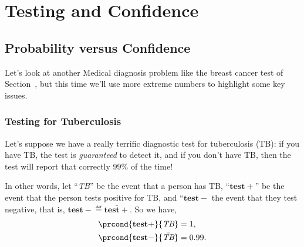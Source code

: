 \chapter{Testing and Confidence}\label{sec: Confidence_v_Prob}

\section{Probability versus Confidence}\label{sec: Confidence_v_Prob}

\newcommand{\BF}[2]{\operatorname{Bayes-factor}(#1,#2)}
\newcommand{\testplus}{\ensuremath{\mathbf{test+}}}
\newcommand{\testminus}{\ensuremath{\mathbf{test-}}}
\newcommand{\TB}{\emph{TB}}

Let's look at another Medical diagnosis problem like the breast cancer
test of Section~, but this time we'll use
more extreme numbers to highlight some key issues.

\subsection{Testing for Tuberculosis}

Let's suppose we have a really terrific diagnostic test for
tuberculosis (TB): if you have TB, the test is \emph{guaranteed} to
detect it, and if you don't have TB, then the test will report that
correctly 99\% of the time!

In other words, let ``\TB'' be the event that a person
has TB, ``\testplus'' be the event that the person tests
positive for TB, and ``$\testminus$ the event that they test negative,
that is, $\testminus \eqdef \bar{\testplus}$.  So we have,
\begin{align}
\prcond{\testplus}{\TB} & = 1,\label{pr+TB}\\
\prcond{\testminus}{\bar{\TB}} & = 0.99.\label{pr-barTB}
\end{align}

